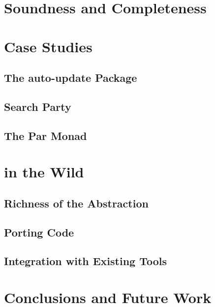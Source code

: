 \section{Soundness and Completeness}
\label{sec:dejafu-correctness}

\blindtext

\section{Case Studies}
\label{sec:dejafu-casestudies}

\blindtext

\subsection{The auto-update Package}
\subsection{Search Party}
\subsection{The Par Monad}

\section{\dejafu{} in the Wild}
\label{sec:dejafu-evaluation}

\blindtext

\subsection{Richness of the Abstraction}
\subsection{Porting Code}
\subsection{Integration with Existing Tools}

\section{Conclusions and Future Work}
\label{sec:dejafu-conclusions}

\blindtext
